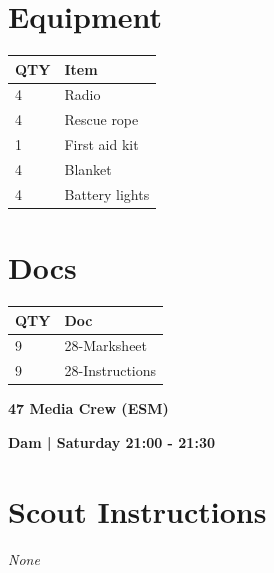 \documentclass[10pt]{article}
\newcommand{\newtitle}[1]{\begin{center}{\Huge\bfseries #1 }\\ \vspace{5mm}\end{center}}
\newcommand{\newsubtitle}[1]{\begin{center}{\color{grey}\Large\bfseries #1 }\\ \vspace{5mm}\end{center}}
\begin{document}
	\begin{multicols}{2}

		\section*{\faWrench \: Equipment}

		
	\begin{center}
			\begin{tabular}{p{2cm}p{4cm}}


				\textbf{QTY} & \textbf{Item} \\\toprule
												4&Radio\\\midrule
												4&Rescue rope\\\midrule
												1&First aid kit\\\midrule
												4&Blanket\\\midrule
												4&Battery lights\\\midrule
								\end{tabular}

			\end{center}

		
		\vfill\null
		\columnbreak

			\section*{\faFile \: Docs}
		 	\begin{center}
			\begin{tabular}{p{2cm}p{4cm}}

			\textbf{QTY} & \textbf{Doc} \\\toprule
										9&28-Marksheet\\\midrule
										9&28-Instructions\\\midrule
							\end{tabular}
			\end{center}
	

		\vfill\null

		\end{multicols}



	\vspace{1cm}


	\clearpage
		\newtitle{47 Media Crew (ESM) }
	\newsubtitle{Dam | Saturday 21:00 - 21:30}
		\setcounter{section}{46}
	\section*{Scout Instructions}
		\textit{None}
	
\end{document}
